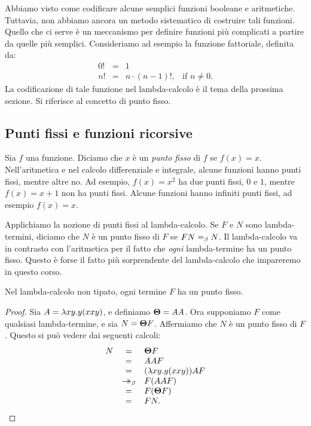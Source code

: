 \documentclass{article}
\begin{document}
Abbiamo visto come codificare alcune semplici funzioni
booleane e aritmetiche. Tuttavia, non abbiamo ancora un metodo sistematico
di costruire tali funzioni. Quello che ci serve \`e un meccanismo per definire
funzioni pi\`u complicati a partire da quelle pi\`u semplici. Consideriamo ad esempio
la funzione fattoriale, definita da:
\[ \begin{array}{rcll}
  0! &=& 1 \\
  n! &=& n\cdot (n-1)!,& \mbox{if $n\neq 0$}.
\end{array}
\]
La codificazione di tale funzione nel lambda-calcolo \`e il tema
della prossima sezione. Si riferisce al concetto di punto fisso.

\subsection{Punti fissi e funzioni ricorsive}\label{subsec-fixed-points}

Sia $f$ una funzione. Diciamo che $x$ \`e un {\em punto fisso} di $f$
se $f(x)=x$. Nell'aritmetica e nel calcolo differenziale e integrale, alcune
funzioni hanno punti fissi, mentre altre no. Ad esempio, $f(x)=x^2$ ha
due punti fissi, $0$ e $1$, mentre $f(x)=x+1$ non ha punti fissi.
Alcune funzioni hanno infiniti punti fissi, ad esempio $f(x)=x$.

Applichiamo la nozione di punti fissi al lambda-calcolo. Se $F$ e
$N$ sono lambda-termini, diciamo che $N$ \`e un punto fisso di $F$ se $FN=_{\beta}
N$.  Il lambda-calcolo va in contrasto con l'aritmetica per il fatto
che {\em ogni} lambda-termine ha un punto fisso. Questo \`e forse il fatto pi\`u
sorprendente del lambda-calcolo che impareremo in questo corso.

\begin{theorem}\label{thm-fix}
Nel lambda-calcolo non tipato, ogni termine $F$ ha un punto fisso.
\end{theorem}

\begin{proof}
  Sia $A=\lambda xy.y(xxy)$, e definiamo $\textbf{\boldmath $\Theta$}=AA$. Ora supponiamo $F$
  come qualsiasi lambda-termine, e sia $N=\textbf{\boldmath $\Theta$} F$. Affermiamo che $N$ \`e un
  punto fisso di $F$. Questo si pu\`o vedere dai seguenti calcoli:
\[ \begin{array}{rcl}
  N 
  &=& \textbf{\boldmath $\Theta$} F \\
  &=& AA F \\
  &=& (\lambda xy.y(xxy))AF \\
  &\mathrel{\rightarrow\!\!\!\!\!\rightarrow}_{\beta}& F(AAF) \\
  &=& F(\textbf{\boldmath $\Theta$} F) \\
  &=& FN.
\end{array}
\]
\eottwo
\end{proof}
\end{document}
